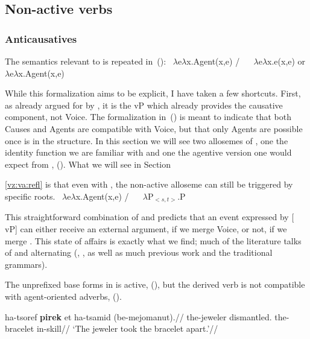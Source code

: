 {	\subsection{Non-active verbs} \label{vz:thit:nact}
		\subsubsection{Anticausatives}
The semantics relevant to {\va} is repeated in~(\nextx):
\pex\label{ex:vz:denote-va}
	\a {} \lra~$\lambda$e$\lambda$x.Agent(x,e) / \trace~\va
	\a {} \lra~$\lambda$e$\lambda$x.e(x,e) or $\lambda$e$\lambda$x.Agent(x,e)
\xe

While this formalization aims to be explicit, I have taken a few shortcuts. First, as already argued for by \cite{layering15}, it is the vP which already provides the causative component, not Voice. The formalization in~(\lastx) is meant to indicate that both Causes and Agents are compatible with Voice, but that only Agents are possible once {\va} is in the structure. In this section we will see two allosemes of {\vz}, one the identity function we are familiar with and one the agentive version one would expect from {\va}, (\nextx). What we will see in Section~{\ref{vz:va:refl} is that even with {\va}, the non-active alloseme can still be triggered by specific roots.
\pex 
	\a \denote{\vz} \lra~$\lambda$e$\lambda$x.Agent(x,e) / \trace~\va
	\a \denote{\vz} \lra~$\lambda$P$_{<s,t>}$.P
\xe

This straightforward combination of {\va} and {\vz} predicts that an event expressed by [{\va} vP] can either receive an external argument, if we merge Voice, or not, if we merge {\vz}. This state of affairs is exactly what we find; much of the literature talks of {\tpie} and {\thit} alternating (\citealt{doron03}, \citealt{arad05}, as well as much previous work and the traditional grammars).

The unprefixed base forms in {\tpie} is active, (\nextx), but the derived verb is not compatible with agent-oriented adverbs, (\anextx).

\pex
	\a \begingl
	\gla ha-{ts}oref \textbf{pirek} et ha-{ts}amid (be-mejomanut).//
	\glb the-jeweler dismantled.  the-bracelet in-skill//
	\glft `The jeweler took the bracelet apart.'//
	\endgl
	\a 
\xe

}}

